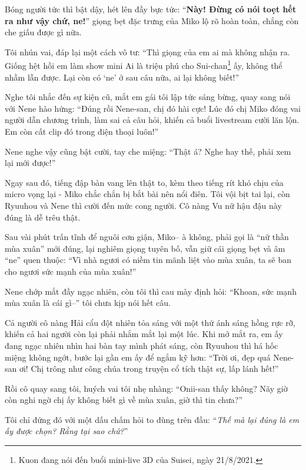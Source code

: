 \documentclass[../main.tex]{subfiles}
\begin{document}
Bóng người tức thì bật dậy, hét lên đầy bực tức: ``\textbf{Này! Đừng có nói toẹt hết ra như vậy chứ, ne!}'' giọng bẹt đặc trưng của Miko lộ rõ hoàn toàn, chẳng còn che giấu được gì nữa.

Tôi nhún vai, đáp lại một cách vô tư: ``Thì giọng của em ai mà không nhận ra. Giống hệt hồi em làm show mini Ai là triệu phú cho Sui-chan\footnote{Kuon đang nói đến buổi mini-live 3D của Suisei, ngày 21/8/2021.} ấy, không thể nhầm lẫn được. Lại còn có `ne' ở sau câu nữa, ai lại không biết!''

Nghe tôi nhắc đến sự kiện cũ, mắt em gái tôi lập tức sáng bừng, quay sang nói với Nene hào hứng: ``Đúng rồi Nene-san, chị đó hài cực! Lúc đó chị Miko đóng vai người dẫn chương trình, làm sai cả câu hỏi, khiến cả buổi livestream cười lăn lộn. Em còn cất clip đó trong điện thoại luôn!''

Nene nghe vậy cũng bật cười, tay che miệng: ``Thật á? Nghe hay thế, phải xem lại mới được!''

Ngay sau đó, tiếng đập bàn vang lên thật to, kèm theo tiếng rít khó chịu của micro vọng lại - Miko chắc chắn bị bắt bài nên nổi điên. Tôi vội bịt tai lại, còn Ryuuhou và Nene thì cười đến mức cong người. Cô nàng Vu nữ hậu đậu này đúng là dễ trêu thật.

Sau vài phút trấn tĩnh để nguôi cơn giận, Miko-- à không, phải gọi là ``nữ thần mùa xuân'' mới đúng, lại nghiêm giọng tuyên bố, vẫn giữ cái giọng bẹt và âm ``ne'' quen thuộc: ``Vì nhà ngươi có niềm tin mãnh liệt vào mùa xuân, ta sẽ ban cho ngươi sức mạnh của mùa xuân!''

Nene chớp mắt đầy ngạc nhiên, còn tôi thì cau mày định hỏi: ``Khoan, sức mạnh mùa xuân là cái gì--'' tôi chưa kịp nói hết câu.

Cả người cô nàng Hải cẩu đột nhiên tỏa sáng với một thứ ánh sáng hồng rực rỡ, khiến cả hai người còn lại phải nhắm mắt lại một lúc. Khi mở mắt ra, em ấy đang ngạc nhiên nhìn hai bàn tay mình phát sáng, còn Ryuuhou thì há hốc miệng không ngớt, bước lại gần em ấy để ngắm kỹ hơn: ``Trời ơi, đẹp quá Nene-san ơi! Chị trông như công chúa trong truyện cổ tích thật sự, lấp lánh hết!''

Rồi cô quay sang tôi, huých vai tôi nhẹ nhàng: ``Onii-san thấy không? Nãy giờ còn nghi ngờ chị ấy không biết gì về mùa xuân, giờ thì tin chưa?''

Tôi chỉ đứng đó với một dấu chấm hỏi to đùng trên đầu: ``\textit{Thế mà lại đúng là em ấy được chọn? Rằng tại sao chứ?}''

\end{document}

